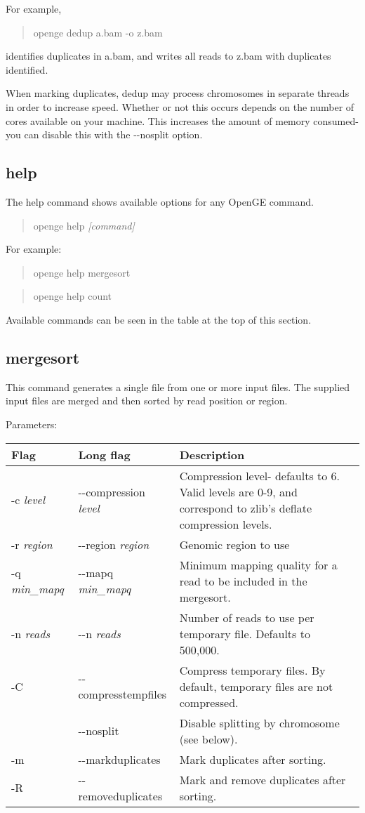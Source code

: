 \documentclass[11pt]{article}
\newcommand {\cmd}[1] {\begin{quote}#1\end{quote}}
\begin{document}
For example,
\cmd{openge dedup a.bam -o z.bam} 
identifies duplicates in a.bam, and writes all reads to z.bam with duplicates identified.

When marking duplicates, dedup may process chromosomes in separate threads in order to increase speed. Whether or not this occurs depends on the number of cores available on your machine. This increases the amount of memory consumed- you can disable this with the {-}{-}nosplit option.

\subsection {help}
The help command shows available options for any OpenGE command. 

\cmd{openge help \textit{[command]}}

For example:

\cmd{openge help mergesort}

\cmd{openge help count}

Available commands can be seen in the table at the top of this section.


\subsection {mergesort}
This command generates a single file from one or more input files. The supplied input files are merged and then sorted by read position or region.

Parameters:
\begin{center}
\begin{tabular}{llp{3.5in}}
\hline
Flag&Long flag&Description\\ \hline
-c \textit{level}&{-}{-}compression \textit{level}&Compression level- defaults to 6. Valid levels are 0-9, and correspond to zlib's deflate compression levels. \\
-r \textit{region}&{-}{-}region \textit{region}&Genomic region to use\\
-q \textit{min\_mapq}&{-}{-}mapq \textit{min\_mapq}&Minimum mapping quality for a read to be included in the mergesort.\\
-n \textit{reads}&{-}{-}n \textit{reads}&Number of reads to use per temporary file. Defaults to 500,000.\\
-C&{-}{-}compresstempfiles&Compress temporary files. By default, temporary files are not compressed.\\
&{-}{-}nosplit&Disable splitting by chromosome (see below).\\
-m&{-}{-}markduplicates&Mark duplicates after sorting.\\
-R&{-}{-}removeduplicates&Mark and remove duplicates after sorting.\\
\end{tabular}
\end{center}
\end{document}
